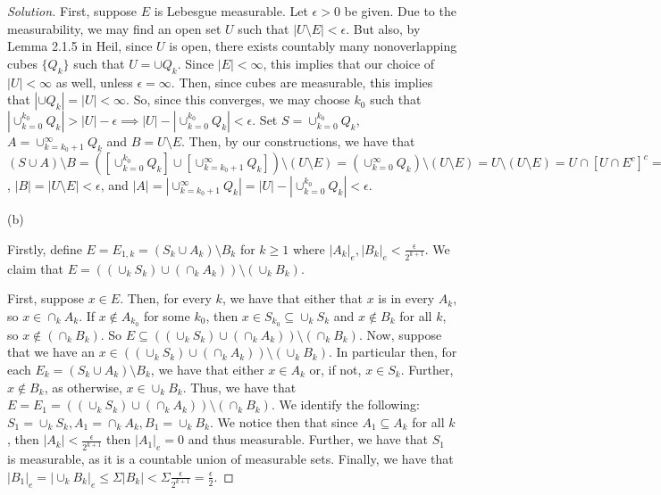 \documentclass[10pt]{article}
\begin{document}
\begin{proof}[Solution]
First, suppose $E$ is Lebesgue measurable. Let $\epsilon > 0$ be given. Due to the measurability, we may find an open set $U$ such that $|U \setminus E| < \epsilon$. But also, by Lemma 2.1.5 in Heil, since $U$ is open, there exists countably many nonoverlapping cubes $\{ Q_k \}$ such that $U = \cup Q_k$. Since $|E| < \infty$, this implies that our choice of $|U| < \infty$ as well, unless $\epsilon = \infty$. Then, since cubes are measurable, this implies that $|\cup Q_k| = |U| < \infty$. So, since this converges, we may choose $k_0$ such that $|\cup_{k=0}^{k_0} Q_k| > |U| - \epsilon \implies |U| - |\cup_{k=0}^{k_0} Q_k| < \epsilon$. Set $S = \cup_{k=0}^{k_0} Q_k$, $A = \cup_{k=k_0+1}^\infty Q_k$ and $B = U \setminus E$. Then, by our constructions, we have that $(S \cup A) \setminus B = ([\cup_{k=0}^{k_0} Q_k] \cup [\cup_{k=k_0+1}^\infty Q_k]) \setminus (U \setminus E) = (\cup_{k=0}^\infty Q_k) \setminus (U \setminus E) = U \setminus (U \setminus E) = U \cap [U \cap E^c]^c = U \cap (E \cup U^c) = (U \cap E) \cup (U \cup U^c) = E$, $|B| = |U \setminus E| < \epsilon$, and $|A| = |\cup_{k=k_0+1}^\infty Q_k| = |U| - |\cup_{k=0}^{k_0} Q_k| < \epsilon$.

(b)

Firstly, define $E = E_{1,k} = (S_k \cup A_k) \setminus B_k$ for $k \geq 1$ where $|A_k|_e,|B_k|_e < \frac{\epsilon}{2^{k + 1}} $. We claim that $E = ((\cup_k S_k) \cup (\cap_k A_k)) \setminus (\cup_k B_k)$.

First, suppose $x \in E$. Then, for every $k$, we have that either that $x$ is in every $A_k$, so $x \in \cap_k A_k$. If $x \not \in A_{k_0}$ for some $k_0$, then $x \in S_{k_0} \subseteq \cup_k S_k$  and $x \not \in B_k$ for all $k$, so $x \not \in (\cap_k B_k)$. So $E \subseteq ((\cup_k S_k) \cup (\cap_k A_k)) \setminus (\cap_k B_k)$. Now, suppose that we have an $x \in  ((\cup_k S_k) \cup (\cap_k A_k)) \setminus (\cup_k B_k)$. In particular then, for each $E_k = (S_k \cup A_k) \setminus B_k$, we have that either $x \in A_k$ or, if not, $x \in S_k$. Further, $x \not \in B_k$, as otherwise, $x \in \cup_k B_k$. Thus, we have that $E= E_1 = ((\cup_k S_k) \cup (\cap_k A_k)) \setminus (\cap_k B_k)$. We identify the following: $S_1 = \cup_k S_k, A_1 = \cap_k A_k, B_1 = \cup_k B_k$. We notice then that since $A_1 \subseteq A_k$ for all $k$, then $|A_k| < \frac{\epsilon}{2^{k + 1}}$  then $|A_1|_e = 0$ and thus measurable. Further, we have that $S_1$ is measurable, as it is a countable union of measurable sets. Finally, we have that $ |B_1|_e = |\cup_k B_k|_e \leq \Sigma |B_k| < \Sigma \frac{\epsilon}{2^{k + 1}} = \frac{\epsilon}{2}$.


\end{proof}
\end{document}

